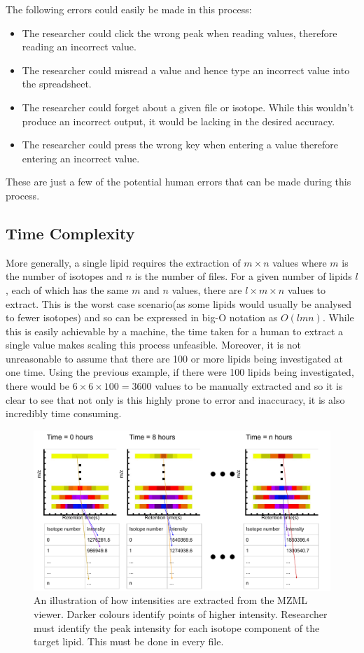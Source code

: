\documentclass{l4proj}
\begin{document}
The following errors could easily be made in this process:
\begin{itemize}
    \item The researcher could click the wrong peak when reading values, therefore reading an incorrect value.
    \item The researcher could misread a value and hence type an incorrect value into the spreadsheet.
    \item The researcher could forget about a given file or isotope. While this wouldn't produce an incorrect output, it would be lacking in the desired accuracy.
    \item The researcher could press the wrong key when entering a value therefore entering an incorrect value.
\end{itemize}
These are just a few of the potential human errors that can be made during this process. 


\subsection{Time Complexity}
 More generally, a single lipid requires the extraction of $m\times n$ values where $m$ is the number of isotopes and $n$ is the number of files. For a given number of lipids $l$, each of which has the same  $m$ and $n$ values, there are $l\times m\times n$ values to extract. This is the worst case scenario(as some lipids would usually be analysed to fewer isotopes) and so can be expressed in big-O notation as $O(lmn)$. While this is easily achievable by a machine, the time taken for a human to extract a single value makes scaling this process unfeasible. Moreover, it is not unreasonable to assume that there are 100 or more lipids being investigated at one time. Using the previous example, if there were 100 lipids being investigated, there would be $6\times6\times100=3600$ values to be manually extracted and so it is clear to see that not only is this highly prone to error and inaccuracy, it is also incredibly time consuming.

\begin{figure}[htb]
    \centering
    \includegraphics[width=\textwidth]{dissertation/images/ToppView Diagram (3).pdf}
    \caption{An illustration of how intensities are extracted from the MZML viewer. Darker colours identify points of higher intensity. Researcher must identify the peak intensity for each isotope component of the target lipid. This must be done in every file.}
    \label{fig:toppView}
\end{figure}
\end{document}
